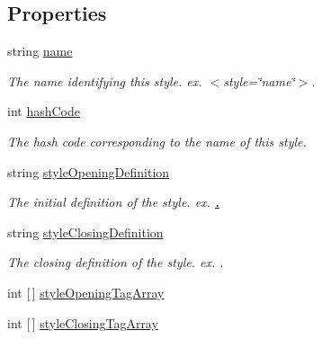 \subsection*{Properties}
\begin{DoxyCompactItemize}
\item 
string \mbox{\hyperlink{class_t_m_pro_1_1_t_m_p___style_af46a4d247fd1e6fbf78e8497c6f304b6}{name}}
\begin{DoxyCompactList}\small\item\em The name identifying this style. ex. $<$style=\char`\"{}name\char`\"{}$>$. \end{DoxyCompactList}\item 
int \mbox{\hyperlink{class_t_m_pro_1_1_t_m_p___style_a6459a59ebf00adf6722b35a1331ee57a}{hash\+Code}}
\begin{DoxyCompactList}\small\item\em The hash code corresponding to the name of this style. \end{DoxyCompactList}\item 
string \mbox{\hyperlink{class_t_m_pro_1_1_t_m_p___style_a9ad5821b0ddc0a5e6c0e82da84785afb}{style\+Opening\+Definition}}
\begin{DoxyCompactList}\small\item\em The initial definition of the style. ex. {\bfseries{ \uline{. }}}\end{DoxyCompactList}\item 
string \mbox{\hyperlink{class_t_m_pro_1_1_t_m_p___style_a42965f3ab3ced3820d6b749d6ce918e2}{style\+Closing\+Definition}}
\begin{DoxyCompactList}\small\item\em The closing definition of the style. ex.  . \end{DoxyCompactList}\item 
int \mbox{[}$\,$\mbox{]} \mbox{\hyperlink{class_t_m_pro_1_1_t_m_p___style_a3f1234f2125d45029ccfb05d86690eae}{style\+Opening\+Tag\+Array}}
\item 
int \mbox{[}$\,$\mbox{]} \mbox{\hyperlink{class_t_m_pro_1_1_t_m_p___style_a29870c5c856405472df6e8c4610916eb}{style\+Closing\+Tag\+Array}}
\end{DoxyCompactItemize}


